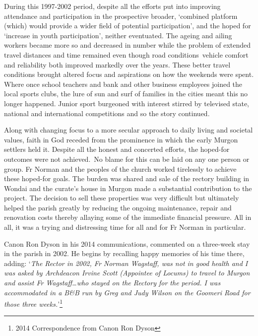 During this 1997-2002 period, despite all the efforts put into improving attendance and participation in the prospective broader, `combined platform (which) would provide a wider field of potential participation', and the hoped for `increase in youth participation', neither eventuated. The ageing and ailing workers became more so and decreased in number while the problem of extended travel distances and time remained even though road conditions~vehicle comfort and reliability both improved markedly over the years. These better travel conditions brought altered focus and aspirations on how the weekends were spent. Where once school teachers and bank and other business employees joined the local sports clubs, the lure of sun and surf of families in the cities meant this no longer happened. Junior sport burgeoned with interest stirred by televised state, national and international competitions and so the story continued.



Along with changing focus to a more secular approach to daily living and societal values, faith in God receded from the prominence in which the early Murgon settlers held it. Despite all the honest and concerted efforts, the hoped-for outcomes were not achieved.~No blame for this can be laid on any one person or group. Fr Norman and the peoples of the church worked tirelessly to achieve these hoped-for goals. The burden was shared and sale of the rectory building in Wondai and the curate's house in Murgon made a substantial contribution to the project. The decision to sell these properties was very difficult but ultimately helped the parish greatly by reducing the ongoing maintenance, repair and renovation costs thereby allaying some of the immediate financial pressure. All in all, it was a trying and distressing time for all and for Fr Norman in particular.



Canon Ron Dyson in his 2014 communications, commented on a three-week stay in the parish in 2002. He begins by recalling happy memories of his time there, adding: `\emph{The Rector in 2002, Fr Norman Wagstaff, was not in good health and I was asked by Archdeacon Irvine Scott (Appointee of Locums) to travel to Murgon and assist Fr Wagstaff\ldots who stayed on the Rectory for the period. I was accommodated in a B\&B run by Greg and Judy Wilson on the Goomeri Road for those three weeks.}'\footnote{2014 Correspondence from Canon Ron Dyson}



